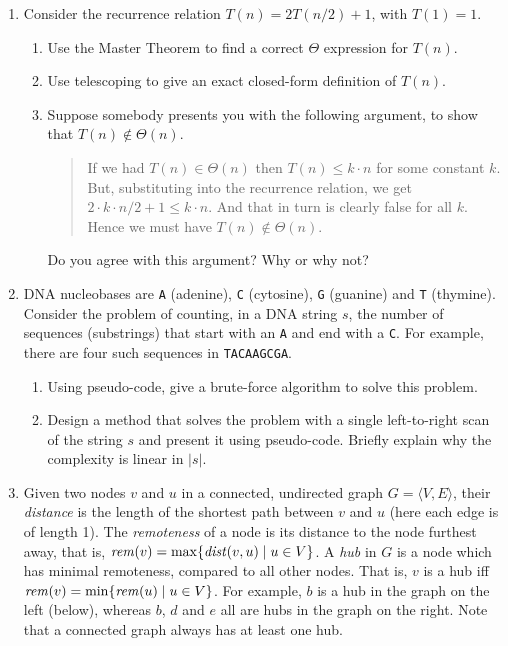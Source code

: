 \documentclass[11pt]{article}
\newcommand{\id}[1]{\mbox{\textit{#1}}}
\newcommand{\tuple}[1]{\langle #1 \rangle}
\begin{document}
\begin{enumerate}
\item
Consider the recurrence relation $T(n) = 2 T(n/2) + 1$, with $T(1) = 1$.
\begin{enumerate}
\item
Use the Master Theorem to find a correct $\Theta$ expression for $T(n)$.
\item
Use telescoping to give an exact closed-form definition of $T(n)$.
\item
Suppose somebody presents you with the following argument, to show
that $T(n) \not\in \Theta(n)$.
\begin{quote}
If we had $T(n) \in \Theta(n)$ then $T(n) \leq k \cdot n$ for some constant $k$.
But, substituting into the recurrence relation, we get
$2 \cdot k \cdot n/2 + 1 \leq k \cdot n$.
And that in turn is clearly false for all $k$.
Hence we must have $T(n) \not\in \Theta(n)$.
\end{quote}
Do you agree with this argument?
Why or why not?
\end{enumerate}

\item
DNA nucleobases are 
\texttt{A} (adenine), 
\texttt{C} (cytosine), 
\texttt{G} (guanine) and 
\texttt{T} (thymine).
Consider the problem of counting, in a DNA string $s$,
the number of sequences (substrings) 
that start with an \verb!A! and end with a \verb!C!.
For example, there are four such sequences in \verb!TACAAGCGA!.
\begin{enumerate}
\item
Using pseudo-code, give a brute-force algorithm to solve this problem.
\item
Design a method that solves the problem with a single left-to-right
scan of the string $s$ and present it using pseudo-code.
Briefly explain why the complexity is linear in $|s|$.
\end{enumerate}

\item
Given two nodes $v$ and $u$ in a connected, undirected graph 
$G = \tuple{V,E}$,
their \emph{distance} is the length of the shortest path between
$v$ and $u$ (here each edge is of length 1).
The \emph{remoteness} of a node is its distance to the node furthest away,
that is, $\id{rem}(v) = \max \{\id{dist}(v,u) \mid u \in V\}$.
A \emph{hub} in $G$ is a node which has minimal
remoteness, compared to all other nodes.
That is, $v$ is a hub iff
$\id{rem}(v) = \min \{\id{rem}(u) \mid u \in V\}$.
For example, $b$ is a hub in the graph on the left (below),
whereas $b$, $d$ and $e$ all are hubs in the graph on the right.
Note that a connected graph always has at least one hub.


\end{enumerate}
\end{document}
